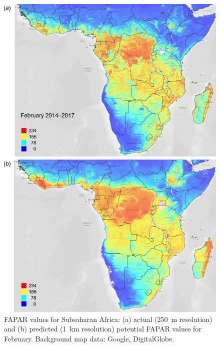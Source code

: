 \documentclass[fleqn,10pt,lineno]{wlpeerj} %
\begin{document}
\begin{figure}[!hp]
\centering
\includegraphics[width=.95\linewidth]{Fig_13.png}
\caption{FAPAR values for Subsaharan Africa: (a) actual (\SI{250}{\metre} resolution) and (b) predicted (\SI{1}{\kilo\metre} resolution) potential FAPAR values for February. Background map data: Google, DigitalGlobe.}
\label{Fig_actual_vs_potential_FAPAR_Feb_SSA}
\end{figure}
\end{document}
